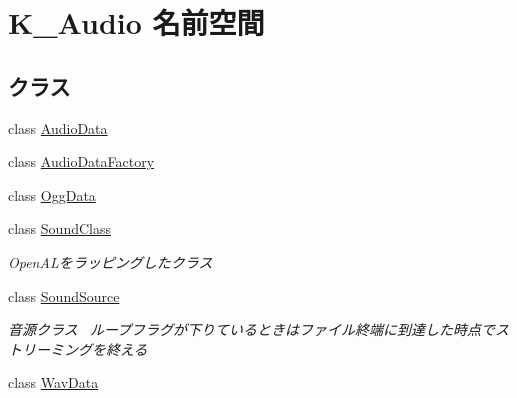 \hypertarget{namespace_k___audio}{}\section{K\+\_\+\+Audio 名前空間}
\label{namespace_k___audio}
\subsection*{クラス}
\begin{DoxyCompactItemize}
\item 
class \mbox{\hyperlink{class_k___audio_1_1_audio_data}{Audio\+Data}}
\item 
class \mbox{\hyperlink{class_k___audio_1_1_audio_data_factory}{Audio\+Data\+Factory}}
\item 
class \mbox{\hyperlink{class_k___audio_1_1_ogg_data}{Ogg\+Data}}
\item 
class \mbox{\hyperlink{class_k___audio_1_1_sound_class}{Sound\+Class}}
\begin{DoxyCompactList}\small\item\em Open\+A\+Lをラッピングしたクラス \end{DoxyCompactList}\item 
class \mbox{\hyperlink{class_k___audio_1_1_sound_source}{Sound\+Source}}
\begin{DoxyCompactList}\small\item\em 音源クラス~\newline
ループフラグが下りているときはファイル終端に到達した時点でストリーミングを終える \end{DoxyCompactList}\item 
class \mbox{\hyperlink{class_k___audio_1_1_wav_data}{Wav\+Data}}
\end{DoxyCompactItemize}
